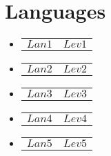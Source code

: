 \documentclass[letterpaper,11pt]{article}
\makeatletter
\newcommand{\resumeProjectHeading}[2]{
    \item
    \begin{tabular*}{0.97\textwidth}{l@{\extracolsep{\fill}}r}
      \small#1 & \textit{#2} \\
    \end{tabular*}\vspace{-7pt}
}
\newcommand{\resumeSubHeadingListStart}{\begin{itemize}[leftmargin=0.15in,rightmargin=1.8in, leftmargin=0.15in, label={}]}
\newcommand{\resumeSubHeadingListEnd}{\end{itemize}}
\makeatother
\begin{document}
%   



\section{Languages}
    \resumeSubHeadingListStart
      \resumeProjectHeading
          {\textbf{$Lan1$}}
          {$Lev1$}
      \resumeProjectHeading
          {\textbf{$Lan2$}}
          {$Lev2$}
      \resumeProjectHeading
          {\textbf{$Lan3$}}
          {$Lev3$}
      \resumeProjectHeading
          {\textbf{$Lan4$}}
          {$Lev4$}
      \resumeProjectHeading
          {\textbf{$Lan5$}}
          {$Lev5$}
    \resumeSubHeadingListEnd
\end{document}
